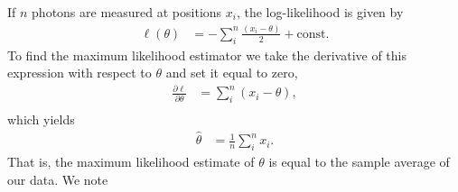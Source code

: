 If $n$ photons are measured at positions $x_i$, the log-likelihood is given by
\begin{align}
  \ell(\theta) &= -\sum_i^n \frac{(x_i - \theta)}{2} + \text{const}.
\end{align}
To find the maximum likelihood estimator we take the derivative of this expression with respect to $\theta$ and set it equal to zero,
\begin{align}
\nonumber  \frac{\partial \ell}{\partial \theta} &= \sum_i^n (x_i - \theta), \\
\end{align}
which yields
\begin{align}
  \hat{\theta} &= \frac{1}{n}\sum_i^n x_i.
\end{align}
That is, the maximum likelihood estimate of $\theta$ is equal to the sample average of our data.  We note 
